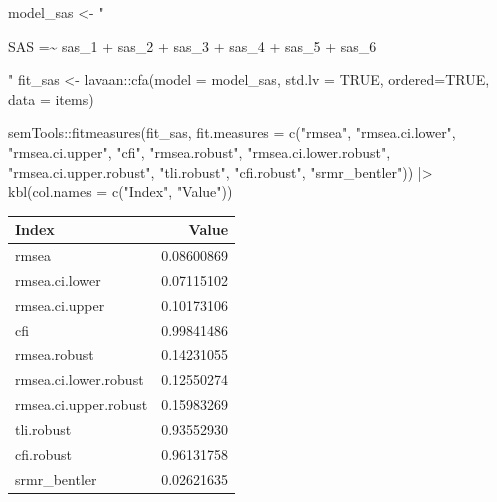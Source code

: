\documentclass[
  letterpaper,
  DIV=11,
  numbers=noendperiod]{scrreprt}
\newenvironment{Shaded}{\begin{snugshade}}{\end{snugshade}}
\newcommand{\AttributeTok}[1]{\textcolor[rgb]{0.40,0.45,0.13}{#1}}
\newcommand{\ConstantTok}[1]{\textcolor[rgb]{0.56,0.35,0.01}{#1}}
\newcommand{\FunctionTok}[1]{\textcolor[rgb]{0.28,0.35,0.67}{#1}}
\newcommand{\NormalTok}[1]{\textcolor[rgb]{0.00,0.23,0.31}{#1}}
\newcommand{\OtherTok}[1]{\textcolor[rgb]{0.00,0.23,0.31}{#1}}
\newcommand{\SpecialCharTok}[1]{\textcolor[rgb]{0.37,0.37,0.37}{#1}}
\newcommand{\StringTok}[1]{\textcolor[rgb]{0.13,0.47,0.30}{#1}}
\begin{document}
\begin{Shaded}
\begin{Highlighting}[]
\NormalTok{model\_sas }\OtherTok{\textless{}{-}} \StringTok{"}

\StringTok{SAS =\textasciitilde{} sas\_1 + sas\_2 + sas\_3 + sas\_4 + sas\_5 + sas\_6}

\StringTok{"}
\NormalTok{fit\_sas }\OtherTok{\textless{}{-}}\NormalTok{ lavaan}\SpecialCharTok{::}\FunctionTok{cfa}\NormalTok{(}\AttributeTok{model =}\NormalTok{ model\_sas,}
                        \AttributeTok{std.lv =} \ConstantTok{TRUE}\NormalTok{, }\AttributeTok{ordered=}\ConstantTok{TRUE}\NormalTok{, }\AttributeTok{data =}\NormalTok{ items)}

\NormalTok{semTools}\SpecialCharTok{::}\FunctionTok{fitmeasures}\NormalTok{(fit\_sas, }
                         \AttributeTok{fit.measures =} \FunctionTok{c}\NormalTok{(}\StringTok{"rmsea"}\NormalTok{, }\StringTok{"rmsea.ci.lower"}\NormalTok{, }\StringTok{"rmsea.ci.upper"}\NormalTok{, }\StringTok{"cfi"}\NormalTok{,}
                                          \StringTok{"rmsea.robust"}\NormalTok{, }\StringTok{"rmsea.ci.lower.robust"}\NormalTok{, }\StringTok{"rmsea.ci.upper.robust"}\NormalTok{, }\StringTok{"tli.robust"}\NormalTok{, }\StringTok{"cfi.robust"}\NormalTok{, }\StringTok{"srmr\_bentler"}\NormalTok{)) }\SpecialCharTok{|\textgreater{}} 
  \FunctionTok{kbl}\NormalTok{(}\AttributeTok{col.names =} \FunctionTok{c}\NormalTok{(}\StringTok{"Index"}\NormalTok{, }\StringTok{"Value"}\NormalTok{))}
\end{Highlighting}
\end{Shaded}

\begin{tabular}[t]{l|r}
\hline
Index & Value\\
\hline
rmsea & 0.08600869\\
\hline
rmsea.ci.lower & 0.07115102\\
\hline
rmsea.ci.upper & 0.10173106\\
\hline
cfi & 0.99841486\\
\hline
rmsea.robust & 0.14231055\\
\hline
rmsea.ci.lower.robust & 0.12550274\\
\hline
rmsea.ci.upper.robust & 0.15983269\\
\hline
tli.robust & 0.93552930\\
\hline
cfi.robust & 0.96131758\\
\hline
srmr\_bentler & 0.02621635\\
\hline
\end{tabular}
\end{document}
